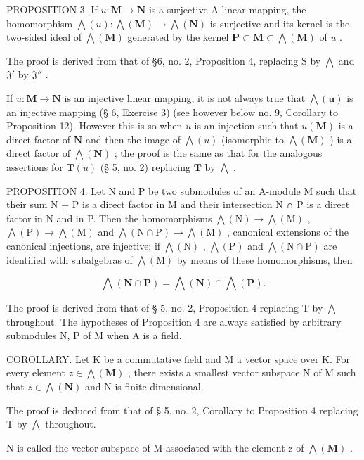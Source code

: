 PROPOSITION 3. If \(u: \mathbf{M} \to \mathbf{N}\) is a surjective A-linear mapping, the homomorphism \(\bigwedge(u): \bigwedge(\mathbf{M}) \to \bigwedge(\mathbf{N})\) is surjective and its kernel is the two-sided ideal of \(\bigwedge(\mathbf{M})\) generated by the kernel \(\mathbf{P} \subset \mathbf{M} \subset \bigwedge(\mathbf{M})\) of \(u\) .

The proof is derived from that of §6, no. 2, Proposition 4, replacing S by \(\bigwedge\) and \(\mathfrak{J}'\) by \(\mathfrak{J}''\) .

If \(u: \mathbf{M} \to \mathbf{N}\) is an injective linear mapping, it is not always true that \(\bigwedge(\mathbf{u})\) is an injective mapping (§ 6, Exercise 3) (see however below no. 9, Corollary to Proposition 12). However this is so when \(u\) is an injection such that \(u(\mathbf{M})\) is a direct factor of \(\mathbf{N}\) and then the image of \(\bigwedge(u)\) (isomorphic to \(\bigwedge(\mathbf{M})\) ) is a direct factor of \(\bigwedge(\mathbf{N})\) ; the proof is the same as that for the analogous assertions for \(\mathbf{T}(u)\) (§ 5, no. 2) replacing \(\mathbf{T}\) by \(\bigwedge\) .

PROPOSITION 4. Let N and P be two submodules of an A-module M such that their sum N + P is a direct factor in M and their intersection N ∩ P is a direct factor in N and in P. Then the homomorphisms \(\bigwedge(\mathrm{N}) \to \bigwedge(\mathrm{M})\) , \(\bigwedge(\mathrm{P}) \to \bigwedge(\mathrm{M})\) and \(\bigwedge(\mathrm{N} \cap \mathrm{P}) \to \bigwedge(\mathrm{M})\) , canonical extensions of the canonical injections, are injective; if \(\bigwedge(\mathrm{N})\) , \(\bigwedge(\mathrm{P})\) and \(\bigwedge(\mathrm{N} \cap \mathrm{P})\) are identified with subalgebras of \(\bigwedge(\mathrm{M})\) by means of these homomorphisms, then

\[
\bigwedge (\mathbf {N} \cap \mathbf {P}) = \bigwedge (\mathbf {N}) \cap \bigwedge (\mathbf {P}).\tag{5}
\]

The proof is derived from that of § 5, no. 2, Proposition 4 replacing T by \(\bigwedge\) throughout. The hypotheses of Proposition 4 are always satisfied by arbitrary submodules N, P of M when A is a field.

COROLLARY. Let K be a commutative field and M a vector space over K. For every element \(z \in \bigwedge(\mathbf{M})\) , there exists a smallest vector subspace N of M such that \(z \in \bigwedge(\mathbf{N})\) and N is finite-dimensional.

The proof is deduced from that of § 5, no. 2, Corollary to Proposition 4 replacing T by \(\bigwedge\) throughout.

N is called the vector subspace of M associated with the element z of \(\bigwedge(\mathbf{M})\) .
\relax{}
